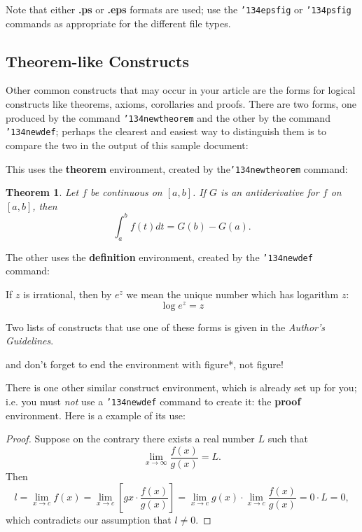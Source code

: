 \documentclass{acm_proc_article-sp}
\begin{document}
Note that either {\textbf{.ps}} or {\textbf{.eps}} formats are
used; use
the \texttt{{\char'134}epsfig} or \texttt{{\char'134}psfig}
commands as appropriate for the different file types.

\subsection{Theorem-like Constructs}
Other common constructs that may occur in your article are
the forms for logical constructs like theorems, axioms,
corollaries and proofs.  There are
two forms, one produced by the
command \texttt{{\char'134}newtheorem} and the
other by the command \texttt{{\char'134}newdef}; perhaps
the clearest and easiest way to distinguish them is
to compare the two in the output of this sample document:

This uses the \textbf{theorem} environment, created by
the\linebreak\texttt{{\char'134}newtheorem} command:
\newtheorem{theorem}{Theorem}
\begin{theorem}
Let $f$ be continuous on $[a,b]$.  If $G$ is
an antiderivative for $f$ on $[a,b]$, then
\begin{displaymath}\int^b_af(t)dt = G(b) - G(a).\end{displaymath}
\end{theorem}

The other uses the \textbf{definition} environment, created
by the \texttt{{\char'134}newdef} command:
\begin{definition}
If $z$ is irrational, then by $e^z$ we mean the
unique number which has
logarithm $z$: \begin{displaymath}{\log e^z = z}\end{displaymath}
\end{definition}

Two lists of constructs that use one of these
forms is given in the
\textit{Author's  Guidelines}.

and don't forget to end the environment with
{figure*}, not {figure}!
 
There is one other similar construct environment, which is
already set up
for you; i.e. you must \textit{not} use
a \texttt{{\char'134}newdef} command to
create it: the \textbf{proof} environment.  Here
is a example of its use:
\begin{proof}
Suppose on the contrary there exists a real number $L$ such that
\begin{displaymath}
\lim_{x\rightarrow\infty} \frac{f(x)}{g(x)} = L.
\end{displaymath}
Then
\begin{displaymath}
l=\lim_{x\rightarrow c} f(x)
= \lim_{x\rightarrow c}
\left[ g{x} \cdot \frac{f(x)}{g(x)} \right ]
= \lim_{x\rightarrow c} g(x) \cdot \lim_{x\rightarrow c}
\frac{f(x)}{g(x)} = 0\cdot L = 0,
\end{displaymath}
which contradicts our assumption that $l\neq 0$.
\end{proof}
\end{document}
